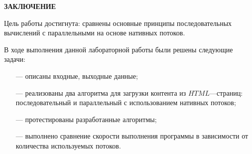 \begin{center}
    \textbf{ЗАКЛЮЧЕНИЕ}
\end{center}

Цель работы достигнута: сравнены основные принципы последовательных вычислений с параллельными на основе нативных потоков.

\vspace{5mm}

В ходе выполнения данной лабораторной работы были решены следующие задачи:
\begin{itemize}
    \item[---] описаны входные, выходные данные;
    \item[---] реализованы два алгоритма для загрузки контента из $HTML$---страниц: последовательный и параллельный с использованием нативных потоков;
    \item[---] протестированы разработанные алгоритмы;
    \item[---] выполнено сравнение скорости выполнения программы в зависимости от количества используемых потоков.
\end{itemize}